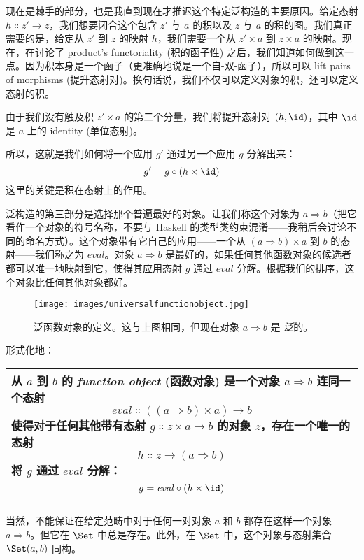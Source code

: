\noindent
现在是棘手的部分，也是我直到现在才推迟这个特定泛构造的主要原因。给定态射 $h \Colon z'\to z$，我们想要闭合这个包含 $z'$ 与 $a$ 的积以及 $z$ 与 $a$ 的积的图。我们真正需要的是，给定从 $z'$ 到 $z$ 的映射 $h$，我们需要一个从 $z' \times a$ 到 $z \times a$ 的映射。现在，在讨论了 \hyperref[functoriality]{product's functoriality} (积的函子性) 之后，我们知道如何做到这一点。因为积本身是一个函子（更准确地说是一个自-双-函子），所以可以 lift pairs of morphisms (提升态射对)。换句话说，我们不仅可以定义对象的积，还可以定义态射的积。

由于我们没有触及积 $z' \times a$ 的第二个分量，我们将提升态射对 $(h, \id)$，其中 $\id$ 是 $a$ 上的 identity (单位态射)。

所以，这就是我们如何将一个应用 $g'$ 通过另一个应用 $g$ 分解出来：
\[g' = g \circ (h \times \id)\]
这里的关键是积在态射上的作用。

泛构造的第三部分是选择那个普遍最好的对象。让我们称这个对象为 $a \Rightarrow b$（把它看作一个对象的符号名称，不要与 Haskell 的类型类约束混淆——我稍后会讨论不同的命名方式）。这个对象带有它自己的应用——一个从 $(a \Rightarrow b) \times a$ 到 $b$ 的态射——我们称之为 $\mathit{eval}$。对象 $a \Rightarrow b$ 是最好的，如果任何其他函数对象的候选者都可以唯一地映射到它，使得其应用态射 $g$ 通过 $\mathit{eval}$ 分解。根据我们的排序，这个对象比任何其他对象都好。

\begin{figure}[H]
  \centering
  \texttt{[image: images/universalfunctionobject.jpg]}
  \caption{泛函数对象的定义。这与上图相同，但现在对象 $a \Rightarrow b$ 是 \emph{泛}的。}
\end{figure}

\noindent
形式化地：

\begin{longtable}[]{@{}l@{}}
  \toprule
  \begin{minipage}[t]{0.97\columnwidth}\raggedright\strut
    从 $a$ 到 $b$ 的 \emph{function object} (函数对象) 是一个对象 $a \Rightarrow b$ 连同一个态射
    \[\mathit{eval} \Colon ((a \Rightarrow b) \times a) \to b\]
    使得对于任何其他带有态射 $g \Colon z \times a \to b$ 的对象 $z$，存在一个唯一的态射
    \[h \Colon z \to (a \Rightarrow b)\]
    将 $g$ 通过 $\mathit{eval}$ 分解：
    \[g = \mathit{eval} \circ (h \times \id)\]
  \end{minipage}\tabularnewline
  \bottomrule
\end{longtable}

\noindent
当然，不能保证在给定范畴中对于任何一对对象 $a$ 和 $b$ 都存在这样一个对象 $a \Rightarrow b$。但它在 $\Set$ 中总是存在。此外，在 $\Set$ 中，这个对象与态射集合 $\Set(a, b)$ 同构。

